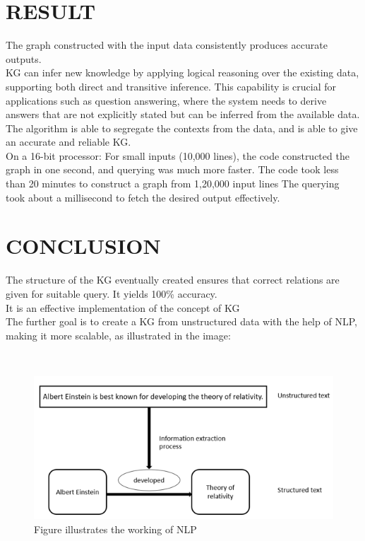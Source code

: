 \documentclass[conference]{IEEEtran}
\begin{document}
\section*{RESULT}
The graph constructed with the input data consistently produces accurate outputs.
\\
KG can infer new knowledge by applying logical reasoning over the existing data, supporting both direct and transitive inference. This capability is crucial for applications such as question answering, where the system needs to derive answers that are not explicitly stated but can be inferred from the available data.
\\
The algorithm is able to segregate the contexts from the data, and is able to give an accurate and reliable KG.
\\
On a 16-bit processor:
For small inputs (10,000 lines), the code constructed the graph in one second, and querying was much more faster.
The code took less than 20 minutes to construct a graph from 1,20,000 input lines 
The querying took about a millisecond to fetch the desired output effectively.

\section*{CONCLUSION}
The structure of the KG eventually created ensures that correct relations are given for suitable query. It yields 100\% accuracy.
\\
It is an effective implementation of the concept of KG
\\
The further goal is to create a KG from unstructured data with the help of NLP, making it more scalable, as illustrated in the image:

\\
\begin{figure}[htbp]
\centering
\includegraphics[width=0.8\linewidth]{nlp_img.png} %
\caption{Figure illustrates the working of NLP}
\label{fig}
\end{figure}
\end{document}
